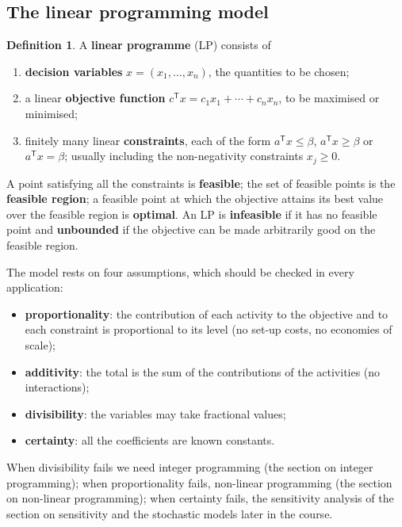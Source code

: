 \documentclass[11pt,a4paper]{article}
\numberwithin{equation}{section}
\theoremstyle{definition}
\newtheorem{defn}[thm]{Definition}
\begin{document}
\subsection{The linear programming model}
\label{ssec:lpmodel}

\begin{defn}
A \textbf{linear programme} (LP) consists of
\begin{enumerate}[label=(\roman*)]
\item \textbf{decision variables} $x = (x_1, \ldots, x_n)$, the quantities to be chosen;
\item a linear \textbf{objective function} $c^{\mathsf T}x = c_1x_1 + \cdots + c_nx_n$, to be maximised or minimised;
\item finitely many linear \textbf{constraints}, each of the form $a^{\mathsf T}x \leq \beta$, $a^{\mathsf T}x \geq \beta$ or $a^{\mathsf T}x = \beta$; usually including the non-negativity constraints $x_j \geq 0$.
\end{enumerate}
A point satisfying all the constraints is \textbf{feasible}; the set of feasible points is the \textbf{feasible region}; a feasible point at which the objective attains its best value over the feasible region is \textbf{optimal}. An LP is \textbf{infeasible} if it has no feasible point and \textbf{unbounded} if the objective
can be made arbitrarily good on the feasible region.
\end{defn}

The model rests on four assumptions, which should be checked in every application:
\begin{itemize}
\item \textbf{proportionality}: the contribution of each activity to the objective and to each constraint is proportional to its level (no set-up costs, no economies of scale);
\item \textbf{additivity}: the total is the sum of the contributions of the activities (no interactions);
\item \textbf{divisibility}: the variables may take fractional values;
\item \textbf{certainty}: all the coefficients are known constants.
\end{itemize}
When divisibility fails we need integer programming (the section on integer programming); when proportionality fails, non-linear programming (the section on non-linear programming); when certainty fails, the sensitivity analysis of the section on sensitivity and the stochastic models later in the course.
\end{document}
